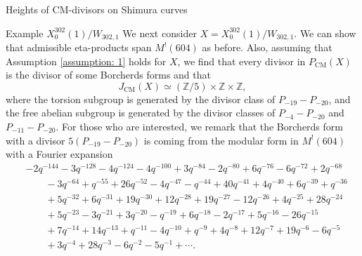 \documentclass{amsart}
\theoremstyle{definition}
\def\Z{\mathbb Z}
\def\CM{\mathrm{CM}}
\begin{document}
\begin{section}{Heights of CM-divisors on Shimura curves}
\begin{subsection}{Example $X_0^{302}(1)/W_{302,1}$}
We next consider $X=X_0^{302}(1)/W_{302,1}$. We can show that admissible
eta-products span $M^!(604)$ as before. Also, assuming that Assumption
\ref{assumption: 1} holds for $X$, we find that every divisor in
$P_\CM(X)$ is the divisor of some Borcherds forms and that
$$
  J_\CM(X)\simeq(\Z/5)\times\Z\times\Z,
$$
where the torsion subgroup is generated by the divisor class of
$P_{-19}-P_{-20}$, and the free abelian subgroup is generated by the
divisor classes of $P_{-4}-P_{-20}$ and $P_{-11}-P_{-20}$. For those
who are interested, we remark that the Borcherds form with a divisor
$5(P_{-19}-P_{-20})$ is coming from the modular form in $M^!(604)$
with a Fourier expansion
\begin{equation*}
\begin{split}
  &-2q^{-144} - 3q^{-128} - 4q^{-124} - 4q^{-100} + 3q^{-84} - 2q^{-80} + 
    6q^{-76} - 6q^{-72} + 2q^{-68} \\
  &\qquad - 3q^{-64} + q^{-55} + 26q^{-52} - 
    4q^{-47} - q^{-44} + 40q^{-41} + 4q^{-40} + 6q^{-39} + q^{-36} \\
  &\qquad + 
    5q^{-32} + 6q^{-31} + 19q^{-30} + 12q^{-28} + 19q^{-27} - 12q^{-26} + 
    4q^{-25} + 28q^{-24} \\
  &\qquad + 5q^{-23} - 3q^{-21} + 3q^{-20} - q^{-19} + 
    6q^{-18} - 2q^{-17} + 5q^{-16} - 26q^{-15} \\
  &\qquad + 7q^{-14} + 14q^{-13} + 
    q^{-11} - 4q^{-10} + q^{-9} + 4q^{-8} + 12q^{-7} + 19q^{-6} -
    6q^{-5} \\
  &\qquad +
    3q^{-4} + 28q^{-3} - 6q^{-2} - 5q^{-1} + \cdots.
\end{split}
\end{equation*}


\end{subsection}
\end{section}
\end{document}
